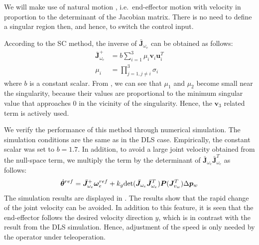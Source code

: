 We will make use of natural motion \cite{Nenchev2007,Nenchev2010}, i.e.\ 
end-effector motion with velocity in proportion to
the determinant of the Jacobian matrix. There is no need to define a singular region then, and hence,
to switch the control input.

According to the SC method,  the inverse of $\bar{\bm{J}}_{\omega_{e}}$ can be obtained as follows:
%
\begin{align}
  \bar{\bm{J}}_{\omega_{e}}^{+} &= b\sum_{i=1}^{3}\mu_{i}\bm{v}_{i}\bm{u}_{i}^{T}\label{eq:SC_INV}\\
  \mu_{i} &= \prod_{j=1, j\not = i}^{3}\sigma_{i}\label{eq:SC_SV}
\end{align}
%
where $b$ is a constant scalar. From ,
we can see that $\mu_{1}$ and $\mu_{2}$ become small near the singularity,
because their values are proportional to the minimum singular value that approaches $0$ in the 
vicinity of the singularity. Hence, the $\bm{v}_{3}$ related term is actively used.

We verify the performance of this method through numerical simulation.
The simulation conditions are the same as in the DLS case. 
Empirically, the constant scalar was set to $b = 1.7$.
In addition, to avoid a large joint velocity obtained from the null-space term,
we multiply the term by the determinant of $\bar{\bm{J}}_{\omega_{e}}\bar{\bm{J}}_{\omega_{e}}^{T}$ as follows:
%
\begin{align}
  {\dot{\bm{\theta}}}^{ref} = \bar{\bm{J}}_{\omega_{e}}^{+}\bm{\omega}_{e}^{ref} + 
k_{g}\mathrm{det}(\bar{\bm{J}}_{\omega_{e}}\bar{\bm{J}}_{\omega_{e}}^{T})\bm{P}(\bm{J}_{v_{w}}^{T})\Delta\bm{p}_{w}
\end{align}
%
The simulation results are displayed in .
The results show that the rapid change of the joint velocity can be avoided.
In addition to this feature, it is seen that the end-effector  follows the desired 
velocity direction $y$, which is in contrast with the result from the DLS simulation.
Hence, adjustment of the speed is only needed by the operator under teleoperation.

